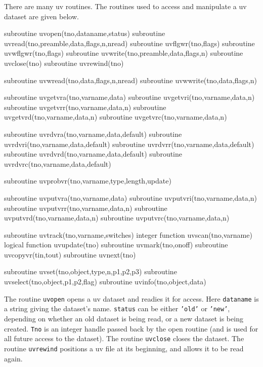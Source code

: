 There are many uv routines.  The routines used to access and manipulate a
uv dataset are given below.
{\ninepoint\begintt

      subroutine uvopen(tno,dataname,status)
      subroutine uvread(tno,preamble,data,flags,n,nread)
      subroutine uvflgwr(tno,flags)
      subroutine uvwflgwr(tno,flags)
      subroutine uvwrite(tno,preamble,data,flags,n)
      subroutine uvclose(tno)
      subroutine uvrewind(tno)

      subroutine uvwread(tno,data,flags,n,nread)
      subroutine uvwwrite(tno,data,flags,n)

      subroutine uvgetvra(tno,varname,data)
      subroutine uvgetvri(tno,varname,data,n)
      subroutine uvgetvrr(tno,varname,data,n)
      subroutine uvgetvrd(tno,varname,data,n)
      subroutine uvgetvrc(tno,varname,data,n)

      subroutine uvrdvra(tno,varname,data,default)
      subroutine uvrdvri(tno,varname,data,default)
      subroutine uvrdvrr(tno,varname,data,default)
      subroutine uvrdvrd(tno,varname,data,default)
      subroutine uvrdvrc(tno,varname,data,default)

      subroutine uvprobvr(tno,varname,type,length,update)

      subroutine uvputvra(tno,varname,data)
      subroutine uvputvri(tno,varname,data,n)
      subroutine uvputvrr(tno,varname,data,n)
      subroutine uvputvrd(tno,varname,data,n)
      subroutine uvputvrc(tno,varname,data,n)

      subroutine uvtrack(tno,varname,switches)
      integer function uvscan(tno,varname)
      logical function uvupdate(tno)
      subroutine uvmark(tno,onoff)
      subroutine uvcopyvr(tin,tout)
      subroutine uvnext(tno)

      subroutine uvset(tno,object,type,n,p1,p2,p3)
      subroutine uvselect(tno,object,p1,p2,flag)
      subroutine uvinfo(tno,object,data)
\endtt}


The routine {\tt uvopen} opens a uv dataset and readies it for access.
Here {\tt dataname} is a string giving the dataset's name. {\tt status} can
be either {\tt 'old'} or {\tt 'new'}, depending on whether an old dataset is
being read, or a new dataset is being created. {\tt Tno} is an integer
handle passed back by the open routine (and is used for all future access
to the dataset). The routine {\tt uvclose} closes the dataset.
The routine {\tt uvrewind} positions a uv file at its beginning, and
allows it to be read again.


